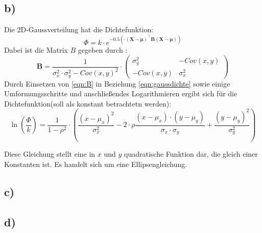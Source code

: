 \subsection{b)}
\label{subsec:a4b}
Die 2D-Gaussverteilung hat die Dichtefunktion:
\\
\begin{equation}
  \label{eqn:gaussdichte}
  \Phi =  k \cdot e^{-0.5 \left( \cdot \left( \symbf{X} - \symbf{\mu} \right)^{\top} \symbf{B} \left( \symbf{X} - \symbf{\mu} \right)\right)}
\end{equation}
Dabei ist die Matrix $B$ gegeben durch :
\\
\begin{equation}
  \label{eqn:B}
  \symbf{B} = \frac{1}{\sigma_{x}^{2} \cdot \sigma_{y}^{2} - Cov\left( x,y \right)^{2}} \cdot
  \begin{pmatrix}
    \sigma_{y}^{2} & -Cov\left( x,y \right)\\
    -Cov\left( x,y \right) & \sigma_{x}^{2}
  \end{pmatrix}
\end{equation}
Durch Einsetzen von \eqref{eqn:B} in Beziehung \eqref{eqn:gaussdichte} sowie einige Umformungsschritte und anschließendes Logarithmieren ergibt sich für die Dichtefunktion(soll als konstant betrachtetn werden):
\\
\begin{equation}
  \label{gaussdichte2}
  \ln\left(\frac{\Phi}{k} \right) = \frac{1}{1-\rho^{2}} \cdot \left( \frac{\left( x - \mu_{x} \right)^{2}}{\sigma_{x}^{2}} - 2 \cdot
  \rho \frac{\left( x - \mu_{x} \right) \cdot \left( y - \mu_{y} \right)}{\sigma_{x} \cdot \sigma_{y}} +
  \frac{\left( y - \mu_{y} \right)^{2}}{\sigma_{y}^{2}} \right)
\end{equation}

Diese Gleichung stellt eine in $x$ und $y$ quadratische Funktion dar, die gleich einer Konstanten ist. Es handelt sich um eine Ellipsengleichung.
\\

\subsection{c)}
\label{subsec:a4c}

\subsection{d)}
\label{subsec:a4d}
